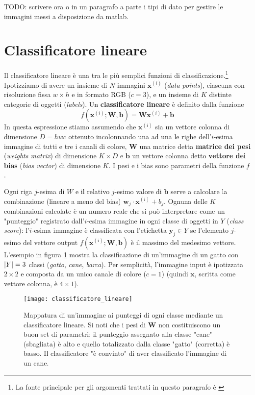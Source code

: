 TODO: scrivere ora o in un paragrafo a parte i tipi di dato per gestire le immagini messi a disposizione da matlab.


\section{Classificatore lineare}
Il classificatore lineare è una tra le più semplici funzioni di classificazione.\footnote{La fonte principale per gli argomenti trattati in questo paragrafo è \cite{cs231n}}
Ipotizziamo di avere un insieme di $N$ immagini $\mathbf{x}^{(i)}$ (\textit{data points}), ciascuna con risoluzione fissa $w\times h$ e in formato RGB ($c=3$), e un insieme di $K$ distinte categorie di oggetti  (\textit{labels}). Un \textbf{classificatore lineare} è definito dalla funzione
\begin{equation} \label{eq_class_lin}
f(\mathbf{x}^{(i)};\mathbf{W},\mathbf{b})=\mathbf{W}\mathbf{x}^{(i)}+\mathbf{b}
\end{equation}
In questa espressione stiamo assumendo che $\mathbf{x}^{(i)}$ sia un vettore colonna di dimensione $D=hwc$ ottenuto incolonnando una ad una le righe dell'$i$-esima immagine di tutti e tre i canali di colore, $\mathbf{W}$ una matrice detta \textbf{matrice dei pesi} (\textit{weights matrix}) di dimensione $K\times D$ e $\mathbf{b}$ un vettore colonna detto \textbf{vettore dei bias} (\textit{bias vector}) di dimensione $K$. I pesi e i bias sono parametri della funzione $f$.

Ogni riga $j$-esima di $W$ e il relativo $j$-esimo valore di $\mathbf{b}$ serve a calcolare la combinazione (lineare a meno del bias) $\mathbf{w}_j\cdot \mathbf{x}^{(i)}+b_j$. Ognuna delle $K$ combinazioni calcolate è un numero reale che si può interpretare come un "punteggio" registrato dall'$i$-esima immagine in ogni classe di oggetti in $Y$ (\textit{class score}): l'$i$-esima immagine è classificata con l'etichetta $\mathbf{y}_j\in Y$ se l'elemento $j$-esimo del vettore output $f(\mathbf{x}^{(i)};\mathbf{W},\mathbf{b})$ è il massimo del medesimo vettore.\\

L'esempio in figura \ref{class_lin} mostra la classificazione di un'immagine di un gatto con $\left|Y\right|=3$ classi (\textit{gatto}, \textit{cane}, \textit{barca}). Per semplicità, l'immagine input è ipotizzata $2\times 2$ e composta da un unico canale di colore ($c=1$) (quindi $\mathbf{x}$, scritta come vettore colonna, è $4\times 1$).

\begin{figure}[h]
\centering
\texttt{[image: classificatore\_lineare]}
\caption{Mappatura di un'immagine ai punteggi di ogni classe mediante un classificatore lineare. Si noti che i pesi di $\mathbf{W}$ non costituiscono un buon set di parametri: il punteggio assegnato alla classe "cane" (sbagliata) è alto e quello totalizzato dalla classe "gatto" (corretta) è basso. Il classificatore "è convinto" di aver classificato l'immagine di un cane.}
\label{class_lin}
\end{figure}

